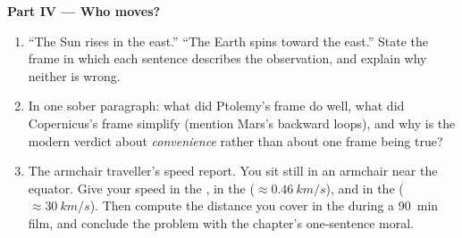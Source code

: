 \begin{problem}
\medskip
\noindent\textbf{Part IV --- Who moves?}
\begin{enumerate}[resume]
  \item ``The Sun rises in the east.'' ``The Earth spins toward the
        east.'' State the frame in which each sentence describes the
        observation, and explain why neither is wrong.
  \item In one sober paragraph: what did Ptolemy's frame do well, what
        did Copernicus's frame simplify (mention Mars's backward
        loops), and why is the modern verdict about \emph{convenience}
        rather than about one frame being true?
  \item The armchair traveller's speed report. You sit still in an
        armchair near the equator. Give your speed in the ,
        in the  ($\approx \qty{0.46}{km/s}$), and in
        the  ($\approx \qty{30}{km/s}$). Then compute
        the distance you cover in the  during a
        \qty{90}{min} film, and conclude the problem with the chapter's
        one-sentence moral.
\end{enumerate}
\end{problem}

